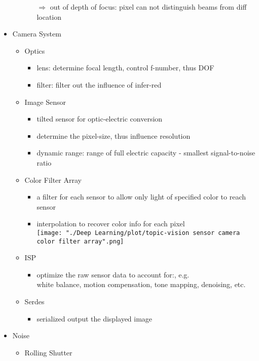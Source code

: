 \begin{itemize}
\begin{itemize}
\begin{itemize}
		$\Rightarrow$ out of depth of focus: pixel can not distinguish beams from diff location
		\end{itemize}
	\end{itemize}
\item Camera System
	\begin{itemize}
	\item Optics
		\begin{itemize}
		\item lens: determine focal length, control f-number, thus DOF
		\item filter: filter out the influence of infer-red
		\end{itemize}
	\item Image Sensor
		\begin{itemize}
		\item tilted sensor for optic-electric conversion
		\item determine the pixel-size, thus influence resolution
		\item dynamic range: range of full electric capacity - smallest signal-to-noise ratio
		\end{itemize}
	\item Color Filter Array
		\begin{itemize}
		\item a filter for each sensor to allow only light of specified color to reach sensor
		\item interpolation to recover color info for each pixel \\
		\texttt{[image: "./Deep Learning/plot/topic-vision sensor camera color filter array".png]}
		\end{itemize} 
	\item ISP
		\begin{itemize}
		\item optimize the raw sensor data to account for:, e.g. \\
		white balance, motion compensation, tone mapping, denoising, etc.
		\end{itemize}
	\item Serdes
		\begin{itemize}
		\item serialized output the displayed image
		\end{itemize}
	\end{itemize}
\item Noise
	\begin{itemize}
	\item Rolling Shutter

\end{itemize}
\end{itemize}
